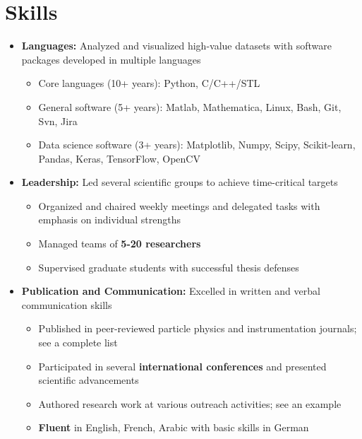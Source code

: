 \documentclass{myfancycv}
\begin{document}
\section{Skills}
\begin{itemize}

\item {\textbf{Languages:} Analyzed and visualized high-value datasets with software packages developed in multiple languages
{\begin{itemize}\setlength\itemindent{-2.2em}
\item Core languages (10+ years): Python, C/C++/STL
\item General software (5+ years): Matlab, Mathematica, Linux, Bash, Git, Svn, Jira
\item Data science software (3+ years): Matplotlib, Numpy, Scipy, Scikit-learn, Pandas, Keras, TensorFlow, OpenCV
\end{itemize}
}
}

\vspace{6pt}

\item {\textbf{Leadership:} Led several scientific groups to achieve time-critical targets
{\begin{itemize}\setlength\itemindent{-2.2em}
    \item Organized and chaired weekly meetings and delegated tasks with emphasis on individual strengths
    \item Managed teams of {\bf5-20 researchers} %
    \item Supervised graduate students with successful thesis defenses



\end{itemize}}%
}

\vspace{6pt}

\item{ \textbf{Publication and Communication:} Excelled in written and verbal communication skills
{\begin{itemize}\setlength\itemindent{-2.2em}
\item Published in peer-reviewed particle physics and instrumentation journals; see a complete list \href{https://orcid.org/0000-0002-9169-0793}{}
\item Participated in several {\bf international conferences} and presented scientific advancements
\item Authored research work at various outreach activities; see an example \href{http://atlas.cern/updates/physics-briefing/probing-dark-matter-higgs-boson}{}
\item {\bf Fluent} in English, French, Arabic with basic skills in German


\end{itemize}}}
\end{itemize}
\end{document}
